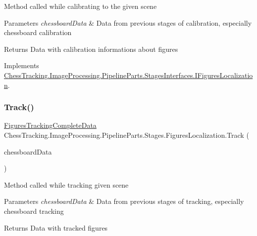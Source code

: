 Method called while calibrating to the given scene 


\begin{DoxyParams}{Parameters}
{\em chessboard\+Data} & Data from previous stages of calibration, especially chessboard calibration\\
\hline
\end{DoxyParams}
\begin{DoxyReturn}{Returns}
Data with calibration informations about figures
\end{DoxyReturn}


Implements \mbox{\hyperlink{interface_chess_tracking_1_1_image_processing_1_1_pipeline_parts_1_1_stages_interfaces_1_1_i_figures_localization_a6d7306330fd25133e389b0f5b02af6e8}{Chess\+Tracking.\+Image\+Processing.\+Pipeline\+Parts.\+Stages\+Interfaces.\+I\+Figures\+Localization}}.

\mbox{\label{class_chess_tracking_1_1_image_processing_1_1_pipeline_parts_1_1_stages_1_1_figures_localization_a1ec6c1018b9ea05d0ec29f66692f8def}} 
\subsubsection{\texorpdfstring{Track()}{Track()}}
{\footnotesize\ttfamily \mbox{\hyperlink{class_chess_tracking_1_1_image_processing_1_1_pipeline_data_1_1_figures_tracking_complete_data}{Figures\+Tracking\+Complete\+Data}} Chess\+Tracking.\+Image\+Processing.\+Pipeline\+Parts.\+Stages.\+Figures\+Localization.\+Track (\begin{DoxyParamCaption}\item[{\mbox{\hyperlink{class_chess_tracking_1_1_image_processing_1_1_pipeline_data_1_1_chessboard_tracking_complete_data}{Chessboard\+Tracking\+Complete\+Data}}}]{chessboard\+Data }\end{DoxyParamCaption})}



Method called while tracking given scene 


\begin{DoxyParams}{Parameters}
{\em chessboard\+Data} & Data from previous stages of tracking, especially chessboard tracking\\
\hline
\end{DoxyParams}
\begin{DoxyReturn}{Returns}
Data with tracked figures
\end{DoxyReturn}


